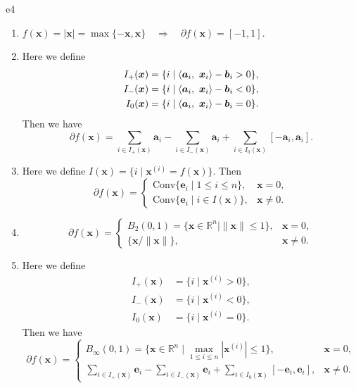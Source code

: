 \documentclass{article}
\newcommand{\RBB}{\mathbb{R}}
\newcommand{\xB}{\bm{x}}
\newcommand{\aB}{\bm{a}}
\newcommand{\bB}{\bm{b}}
\begin{document}
\begin{SOLUTION}{e4}
	\begin{enumerate}
		\item {
			\(f(\xB) = |\xB| = \max\{-\xB, \xB\} \quad \Rightarrow \quad \partial f(\xB) = [-1, 1]\).
		}
		\item {
			Here we define 
			\[
				\begin{aligned}
					I_+(\xB) &= \{ i \mid \innerproduct{\aB_i}{\xB_i} - \bB_i > 0 \},\\
					I_-(\xB) &= \{ i \mid \innerproduct{\aB_i}{\xB_i} - \bB_i < 0 \},\\
					I_0(\xB) &= \{ i \mid \innerproduct{\aB_i}{\xB_i} - \bB_i = 0 \}.
				\end{aligned}	
			\]
			Then we have
			\[
				\partial f(\xB)	= \sum_{i \in I_+(\xB)} \bm{a}_i - \sum_{i \in I_-(\xB)} \bm{a}_i + \sum_{i \in I_0(\xB)} [-\bm{a}_i, \bm{a}_i].
			\]
		}
		\item {
			Here we define \(I(\xB) = \{ i \mid \xB^{(i)} = f(\xB) \}\). Then
			\[
				\partial f(\xB) = \begin{cases}
					\mathrm{Conv} \{ \bm{e}_i \mid 1 \le i \le n \}, & \xB = 0,\\
					\mathrm{Conv} \{ \bm{e}_i \mid i \in I(\xB) \}, & \xB \ne 0.	
				\end{cases}
			\]
		}
		\item {
			\[
				\partial f(\xB)	= \begin{cases}
					B_2(0, 1) = \{ \xB \in \RBB^n \mid \|\xB\| \le 1 \}, &\xB = 0,\\
					\{\xB / \|\xB\|\}, &\xB \ne 0.
				\end{cases}
			\]
		}
		\item {
			Here we define 
			\[
				\begin{aligned}
					I_+(\xB) &= \{ i \mid \xB^{(i)} > 0 \},\\
					I_-(\xB) &= \{ i \mid \xB^{(i)} < 0 \},\\
					I_0(\xB) &= \{ i \mid \xB^{(i)} = 0 \}.
				\end{aligned}	
			\]
			Then we have
			\[
				\partial f(\xB)	= \begin{cases}
					B_\infty(0, 1) = \{ \xB \in \RBB^n \mid \max_{1 \le i \le n} |\xB^{(i)}| \le 1 \}, &\xB = 0,\\
					\sum_{i \in I_+(\xB)} \bm{e}_i - \sum_{i \in I_-(\xB)} \bm{e}_i + \sum_{i \in I_0(\xB)} [-\bm{e}_i, \bm{e}_i], &\xB \ne 0.
				\end{cases}
			\]
		}
	\end{enumerate}
\end{SOLUTION}
\end{document}
